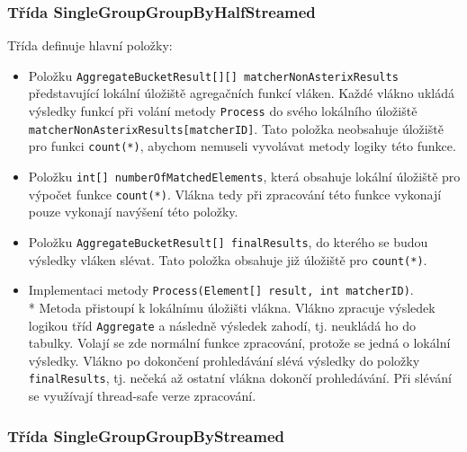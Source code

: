 \subsubsection{Třída SingleGroupGroupByHalfStreamed}

Třída definuje hlavní položky:
\begin{itemize}
\item Položku \texttt{AggregateBucketResult[][] matcherNonAsterixResults} představující lokální úložiště agregačních funkcí vláken.
Každé vlákno ukládá výsledky funkcí při volání metody \texttt{Process} do svého lokálního úložiště \texttt{matcherNonAsterixResults[matcherID]}.
Tato položka neobsahuje úložiště pro funkci \texttt{count(*)}, abychom nemuseli vyvolávat metody logiky této funkce.
\item Položku \texttt{int[] numberOfMatchedElements}, která obsahuje lokální úložiště pro výpočet funkce \texttt{count(*)}.
Vlákna tedy při zpracování této funkce vykonají pouze vykonají navýšení této položky.
\item Položku \texttt{AggregateBucketResult[] finalResults}, do kterého se budou výsledky vláken slévat.
Tato položka obsahuje již úložiště pro \texttt{count(*)}.
\item Implementaci metody \texttt{Process(Element[] result, int matcherID)}.\\*
Metoda přistoupí k lokálnímu úložišti vlákna.
Vlákno zpracuje výsledek logikou tříd \texttt{Aggregate} a následně výsledek zahodí, tj. neukládá ho do tabulky.
Volají se zde normální funkce zpracování, protože se jedná o lokální výsledky.
Vlákno po dokončení prohledávání slévá výsledky do položky \texttt{finalResults}, tj. nečeká až ostatní vlákna dokončí prohledávání.
Při slévání se využívají thread-safe verze zpracování.
\end{itemize}

\subsubsection{Třída SingleGroupGroupByStreamed}

